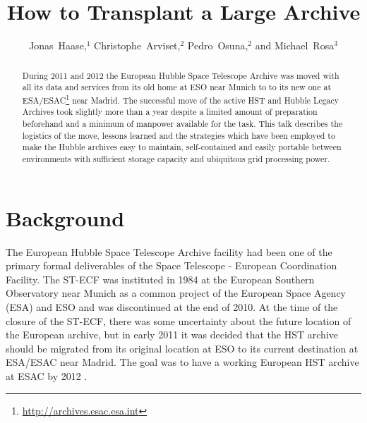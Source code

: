 
\resetcounters




\title{How to Transplant a Large Archive}
\author{Jonas~Haase,$^1$ Christophe~Arviset,$^2$ Pedro~Osuna,$^2$ and Michael~Rosa$^3$}


\begin{abstract}
During 2011 and 2012 the European Hubble Space Telescope Archive was moved with all its data and services from its old home at ESO near Munich to to its new one at ESA/ESAC\footnote{\url{http://archives.esac.esa.int}} near Madrid. The successful move of the active HST and Hubble Legacy Archives took slightly more than a year despite a limited amount of preparation beforehand and a minimum of manpower available for the task. This talk describes the logistics of the move, lessons learned and the strategies which have been employed to make the Hubble archives easy to maintain, self-contained and easily portable between environments with sufficient storage capacity and ubiquitous grid processing power.


\end{abstract}

\section{Background}

The European Hubble Space Telescope Archive facility had been one of the primary formal deliverables of the Space Telescope - European Coordination Facility. The ST-ECF was instituted in 1984 at the European Southern Observatory near Munich as a common project of the European Space Agency (ESA) and ESO and was discontinued at the end of 2010. At the time of the closure of the ST-ECF, there was some uncertainty about the future location of the European archive, but in early 2011 it was decided that the HST archive should be migrated from its original location at ESO to its current destination at ESA/ESAC near Madrid. The goal was to have a working European HST archive at ESAC by 2012 \citep{2012ASPC..461..677H}. 

